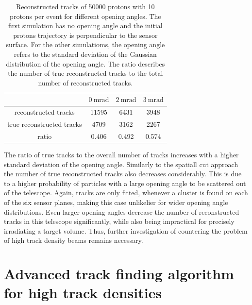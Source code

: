 \begin{table}
  \centering
  \begin{tabular}{c | c c c}
    \toprule
     &  $\SI{0}{\milli\radian}$ & $\SI{2}{\milli\radian}$ & $\SI{3}{\milli\radian}$\\
    \midrule
    reconstructed tracks & 11595 & 6431 & 3948  \\
    true reconstructed tracks & 4709 & 3162 & 2267 \\
    ratio & 0.406 & 0.492 & 0.574
  \end{tabular}
  \caption{Reconstructed tracks of 50000 protons with 10 protons per event for different opening angles. The first simulation has no opening angle and the initial protons
  trajectory is perpendicular to the sensor surface. For the other simulatioms, the opening angle refers to the standard deviation of the Gaussian distribution of
  the opening angle. The ratio describes the number of true reconstructed tracks to the total number of reconstructed tracks.}
  \label{tab:angle}
\end{table}

The ratio of true tracks to the overall number of tracks increases with a higher standard deviation of the opening angle. Similarly to the spatiall cut approach the
number of true reconstructed tracks also decreases considerably. This is due to a higher probability of particles with a large opening angle to be scattered out of the telescope.
Again, tracks are only fitted, whenever a cluster is found on each of the six sensor planes, making this case unlikelier for wider opening angle distributions.
Even larger opening angles decrease the number of reconstructed tracks in this telescope significantly, while also being impractical for precisely irradiating a target volume.
Thus, further investigation of countering the problem of high track density beams remains necessary.

\section{Advanced track finding algorithm for high track densities}

